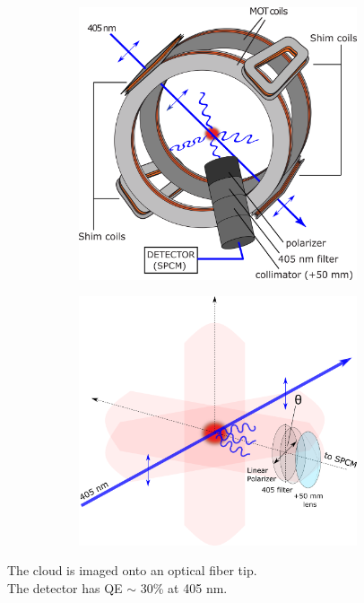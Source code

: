 \documentclass{beamer}
\theoremstyle{definition}
\begin{document}
\begin{frame}
\begin{figure}[!htb]
	\centering
	\hspace{10 pt}
	\begin{subfigure}{0.49\textwidth}
		\includegraphics[width=0.9\textwidth]{MOT.png}
	\end{subfigure}
	\hspace{-20 pt}
	\begin{subfigure}{0.49\textwidth}
		\includegraphics[width=0.9\textwidth]{experimental_geometry}
	\end{subfigure}
\end{figure}

The cloud is imaged onto an optical fiber tip. \\
The detector has QE $\sim$ 30\% at 405 nm.





\end{frame}
\end{document}
